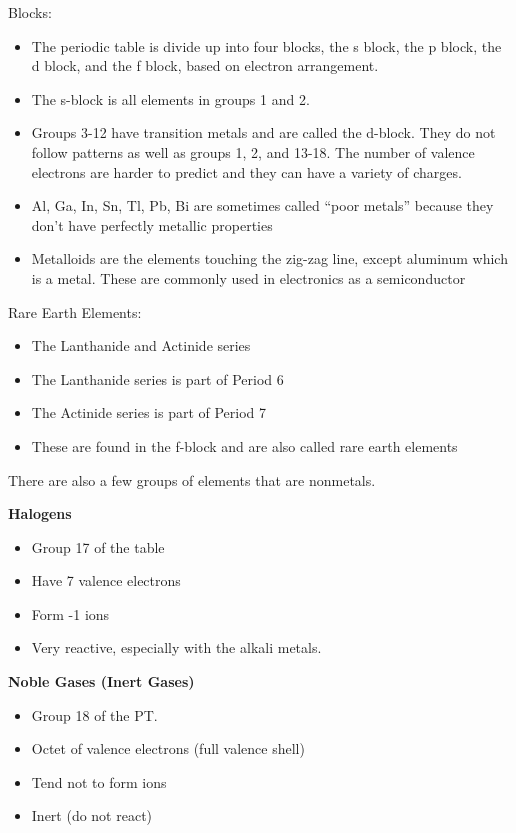 \documentclass[../hchem.tex]{subfiles}
\begin{document}
Blocks:
\begin{itemize}
    \item The periodic table is divide up into four blocks, the s block, the p block, the d block, and the f block, based on electron arrangement.
    \item The s-block is all elements in groups 1 and 2.
    \item Groups 3-12 have transition metals and are called the d-block. They do not follow patterns as well as groups 1, 2, and 13-18. The number of valence electrons are harder to predict and they can have a variety of charges.
    \item Al, Ga, In, Sn, Tl, Pb, Bi are sometimes called ``poor metals'' because they don't have perfectly metallic properties 
    \item Metalloids are the elements touching the zig-zag line, except aluminum which is a metal. These are commonly used in electronics as a semiconductor
\end{itemize}

Rare Earth Elements:
\begin{itemize}
    \item The Lanthanide and Actinide series 
    \item The Lanthanide series is part of Period 6
    \item The Actinide series is part of Period 7
    \item These are found in the f-block and are also called rare earth elements 
\end{itemize}

There are also a few groups of elements that are nonmetals.

\textbf{Halogens}
\begin{itemize}
    \item Group 17 of the table 
    \item Have 7 valence electrons
    \item Form -1 ions
    \item Very reactive, especially with the alkali metals.
\end{itemize}

\textbf{Noble Gases (Inert Gases)}
\begin{itemize}
    \item Group 18 of the PT.
    \item Octet of valence electrons (full valence shell)
    \item Tend not to form ions 
    \item Inert (do not react)
\end{itemize}
\end{document}

